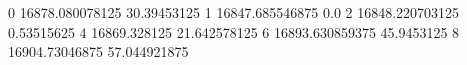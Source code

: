 0 16878.080078125 30.39453125
1 16847.685546875 0.0
2 16848.220703125 0.53515625
4 16869.328125 21.642578125
6 16893.630859375 45.9453125
8 16904.73046875 57.044921875
